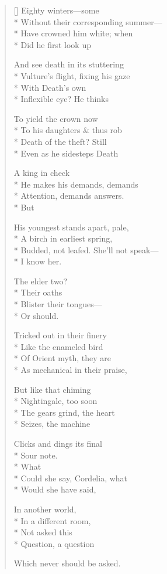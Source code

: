 \label{ch:lear_ag}
\begin{verse}[\versewidth]
 Eighty winters---some\\*
Without their corresponding summer---\\*
Have crowned him white; when\\*
Did he first look up

And see death in its stuttering\\*
Vulture's flight, fixing his gaze\\*
With Death's own\\*
Inflexible eye?\hspace*{3\vgap} He thinks

To yield the crown now\\*
To his daughters \& thus rob\\*
Death of the theft?   Still\\*
Even as he sidesteps Death

A king in check\\*
He makes his demands, demands\\*
Attention, demands answers.\\*
\hspace*{3\vgap} But

His youngest stands apart, pale,\\*
A birch in earliest spring,\\*
Budded, not leafed. She'll not speak---\\*
I know her.

\hspace*{3\vgap} The elder two?\\*
Their oaths\\*
Blister their tongues---\\*
Or should.

Tricked out in their finery\\*
Like the enameled bird\\*
Of Orient myth, they are\\*
As mechanical in their praise,

But like that chiming\\*
Nightingale, too soon\\*
The gears grind, the heart\\*
Seizes, the machine

Clicks and dings its final\\*
Sour note.\\*
\hspace*{3\vgap} What\\*
Could she say, Cordelia, what\\*
Would she have said,

In another world,\\*
In a different room,\\*
Not asked this\\*
Question, a question

Which never should be asked.
\end{verse}
